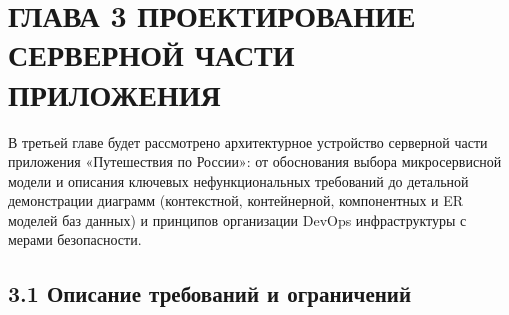 \section{ГЛАВА 3 ПРОЕКТИРОВАНИЕ СЕРВЕРНОЙ ЧАСТИ ПРИЛОЖЕНИЯ}
В третьей главе будет рассмотрено архитектурное устройство серверной части приложения «Путешествия по России»: от обоснования выбора микросервисной модели и описания ключевых нефункциональных требований до детальной демонстрации диаграмм (контекстной, контейнерной, компонентных и ER моделей баз данных) и принципов организации DevOps инфраструктуры с мерами безопасности.

\subsection*{3.1 Описание требований и ограничений}

